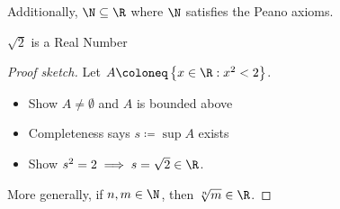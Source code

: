 Additionally, $\N \subseteq \R$ where $\N$ satisfies the Peano axioms.

\begin{thmbox}{$\sqrt{2}$ is a Real Number}{}
    \begin{proof}[Proof sketch]
        Let $A \coloneq \left\{ x \in \R : x^2 < 2 \right\}$.
        \begin{itemize}[noitemsep]
            \item Show $A \neq \emptyset$ and $A$ is bounded above
            \item Completeness says $s \coloneq \sup A$ exists
            \item Show $s^2 = 2 \implies s = \sqrt{2} \in \R$.
        \end{itemize}
        More generally, if $n,m \in \N$, then $\sqrt[n]{m} \in \R$.
    \end{proof}
\end{thmbox}
